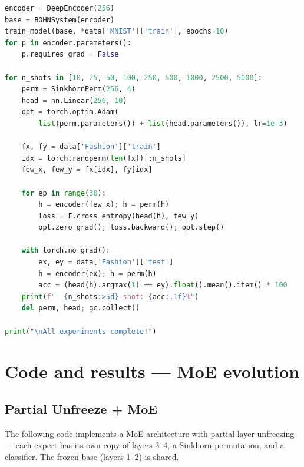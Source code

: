\documentclass[11pt,a4paper]{report}
\begin{document}
\begin{lstlisting}[language=Python]
encoder = DeepEncoder(256)
base = BOHNSystem(encoder)
train_model(base, *data['MNIST']['train'], epochs=10)
for p in encoder.parameters():
    p.requires_grad = False

for n_shots in [10, 25, 50, 100, 250, 500, 1000, 2500, 5000]:
    perm = SinkhornPerm(256, 4)
    head = nn.Linear(256, 10)
    opt = torch.optim.Adam(
        list(perm.parameters()) + list(head.parameters()), lr=1e-3)
    
    fx, fy = data['Fashion']['train']
    idx = torch.randperm(len(fx))[:n_shots]
    few_x, few_y = fx[idx], fy[idx]
    
    for ep in range(30):
        h = encoder(few_x); h = perm(h)
        loss = F.cross_entropy(head(h), few_y)
        opt.zero_grad(); loss.backward(); opt.step()
    
    with torch.no_grad():
        ex, ey = data['Fashion']['test']
        h = encoder(ex); h = perm(h)
        acc = (head(h).argmax(1) == ey).float().mean().item() * 100
    print(f"  {n_shots:>5d}-shot: {acc:.1f}%")
    del perm, head; gc.collect()

print("\nAll experiments complete!")
\end{lstlisting}





\section{Code and results --- MoE evolution}
\label{app:moe_evolution}


\subsection{Partial Unfreeze + MoE}
\label{app:partial_moe}

The following code implements a MoE architecture with partial layer unfreezing --- each expert has its own copy of layers 3--4, a Sinkhorn permutation, and a classifier. The frozen base (layers 1--2) is shared.
\end{document}
